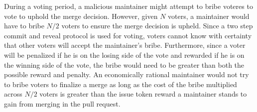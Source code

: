 During a voting period, a malicious maintainer might attempt to bribe voteres
to vote to uphold the merge decision. However, given $N$ voters, a maintainer
would have to bribe $N/2$ voters to ensure the merge decision is upheld. Since a
two step commit and reveal protocol is used for voting, voters cannot know with
certainty that other voters will accept the maintainer's bribe. Furthermore,
since a voter will be penalized if he is on the losing side of the vote and
rewarded if he is on the winning side of the vote, the bribe would need to be
greater than both the possible reward and penalty. An economically rational
maintainer would not try to bribe voters to finalize a merge as long as the cost
of the bribe multiplied across $N/2$ voters is greater than the issue token reward a
maintainer stands to gain from merging in the pull request.

